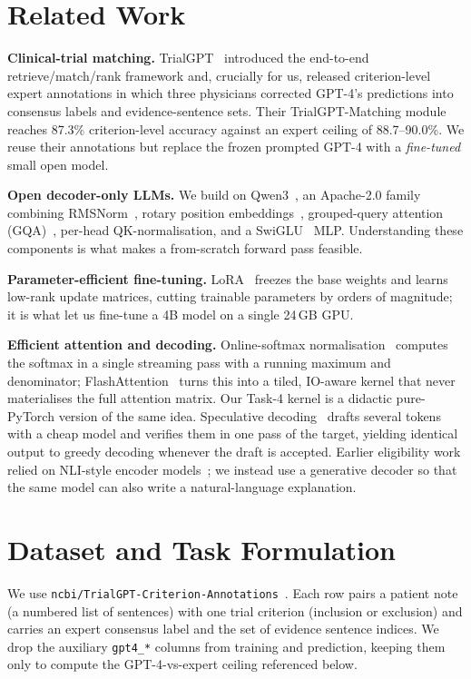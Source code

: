 \documentclass[conference]{IEEEtran}
\begin{document}
\section{Related Work}
\textbf{Clinical-trial matching.} TrialGPT~\cite{jin2024trialgpt} introduced the
end-to-end retrieve/match/rank framework and, crucially for us, released
criterion-level expert annotations in which three physicians corrected GPT-4's
predictions into consensus labels and evidence-sentence sets. Their
TrialGPT-Matching module reaches 87.3\% criterion-level accuracy against an
expert ceiling of 88.7--90.0\%. We reuse their annotations but replace the frozen
prompted GPT-4 with a \emph{fine-tuned} small open model.

\textbf{Open decoder-only LLMs.} We build on Qwen3~\cite{yang2025qwen3}, an
Apache-2.0 family combining RMSNorm~\cite{zhang2019rmsnorm}, rotary position
embeddings~\cite{su2024roformer}, grouped-query attention
(GQA)~\cite{ainslie2023gqa}, per-head QK-normalisation, and a
SwiGLU~\cite{shazeer2020glu} MLP. Understanding these components is what makes a
from-scratch forward pass feasible.

\textbf{Parameter-efficient fine-tuning.} LoRA~\cite{hu2022lora} freezes the base
weights and learns low-rank update matrices, cutting trainable parameters by
orders of magnitude; it is what let us fine-tune a 4B model on a single 24\,GB
GPU.

\textbf{Efficient attention and decoding.} Online-softmax
normalisation~\cite{milakov2018online} computes the softmax in a single streaming
pass with a running maximum and denominator; FlashAttention~\cite{dao2022flashattention}
turns this into a tiled, IO-aware kernel that never materialises the full
attention matrix. Our Task-4 kernel is a didactic pure-PyTorch version of the same
idea. Speculative decoding~\cite{leviathan2023speculative,chen2023accelerating}
drafts several tokens with a cheap model and verifies them in one pass of the
target, yielding identical output to greedy decoding whenever the draft is
accepted. Earlier eligibility work relied on NLI-style encoder
models~\cite{devlin2019bert}; we instead use a generative decoder so that the
same model can also write a natural-language explanation.

\section{Dataset and Task Formulation}
\label{sec:data}
We use \texttt{ncbi/TrialGPT-Criterion-Annotations}~\cite{jin2024trialgpt}. Each
row pairs a patient note (a numbered list of sentences) with one trial criterion
(inclusion or exclusion) and carries an expert consensus label and the set of
evidence sentence indices. We drop the auxiliary \texttt{gpt4\_*} columns from
training and prediction, keeping them only to compute the GPT-4-vs-expert ceiling
referenced below.
\end{document}
